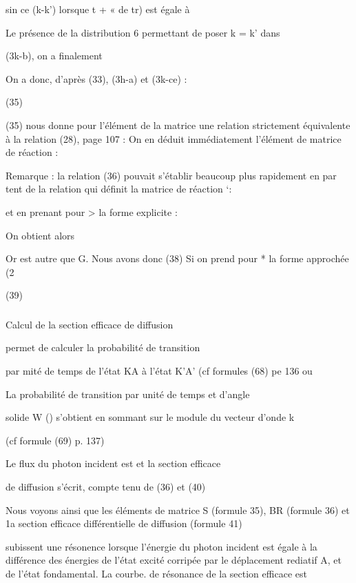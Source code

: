 sin ce (k-k') 
lorsque t + « de tr) est égale à 

Le présence de la distribution 6 permettant de poser k = k' dans

(3k-b), on a finalement


On a donc, d'après (33), (3h-a) et (3k-ce) :



(35) 

(35) nous donne pour l'élément de la matrice  une relation strictement
équivalente à la relation (28), page 107 :
On en déduit immédiatement l'élément de matrice de réaction :


Remarque : la relation (36) pouvait s'établir beaucoup plus rapidement en par
tent de la relation qui définit la matrice de réaction ‘:

et en prenant pour > la forme explicite :

On obtient alors

Or  est autre que G. Nous avons donc
(38)
Si on prend pour * la forme approchée (2%

(39)

\subsubsection{} Calcul de la section efficace de diffusion%

 permet de calculer la probabilité de transition

par mité de temps de l'état KA à l'état K'A' (cf formules (68) pe 136 ou

La probabilité de transition par unité de temps et d'angle

solide W () s'obtient en sommant sur le module du vecteur d'onde k

(cf formule (69) p. 137)

Le flux du photon incident est et la section efficace

de diffusion s'écrit, compte tenu de (36) et (40)

Nous voyons ainsi que les éléments de matrice S (formule 35),
BR (formule 36) et 1a section efficace différentielle de diffusion (formule 41)

subissent une résonence lorsque l'énergie du photon incident est égale à la
différence des énergies de l'état excité corripée par le déplacement rediatif
A, et de l'état fondamental. La courbe. de résonance de la section efficace est

